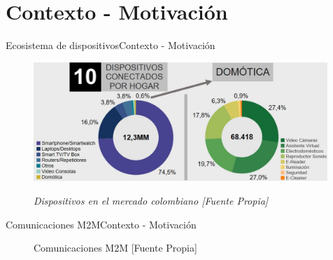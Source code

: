 \section{Contexto - Motivación}
\begin{frame}{Ecosistema de dispositivos}{Contexto - Motivación}
    \begin{figure}				
		{\includegraphics[width=0.99\textwidth,keepaspectratio]{Sustentacion/Figures/DispositivosColombia.JPG}}
		\caption{\small \sl Dispositivos en el mercado colombiano [Fuente Propia]}
		\label{figure:Ecosistema}
    \end{figure}
\end{frame}
\begin{frame}{Comunicaciones M2M}{Contexto - Motivación}
\begin{figure}[htbp]
	    \centering
	    \caption{Comunicaciones M2M [Fuente Propia]}
	    \label{fig:M2M}
    \end{figure}
\end{frame}
